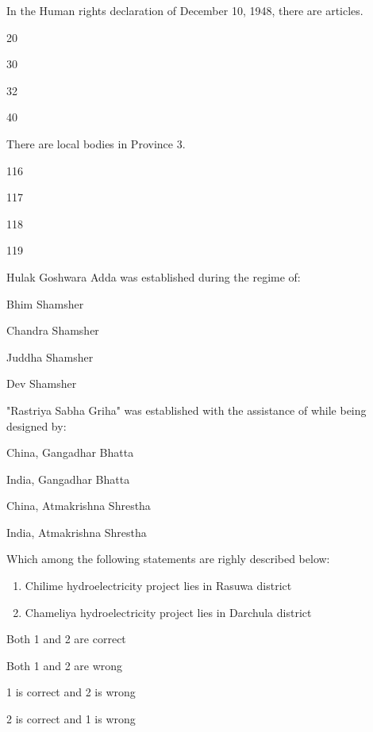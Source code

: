 \begin{questions}
\question In the Human rights declaration of December 10, 1948, there are \fillin[][2cm] articles.
  \begin{items}
  \item 20
  \item* 30
  \item 32
  \item 40
  \end{items}

\question There are \fillin[][2cm] local bodies in Province 3.
  \begin{items}
  \item 116
  \item 117
  \item 118
  \item* 119
  \end{items}

\question Hulak Goshwara Adda was established during the regime of:
  \begin{items}
  \item Bhim Shamsher
  \item* Chandra Shamsher
  \item Juddha Shamsher
  \item Dev Shamsher
  \end{items}

\question "Rastriya Sabha Griha" was established with the assistance of \fillin[][3.5cm] while being designed by:
  \begin{items}
  \item* China, Gangadhar Bhatta
  \item India, Gangadhar Bhatta
  \item China, Atmakrishna Shrestha
  \item India, Atmakrishna Shrestha
  \end{items}

\question Which among the following statements are righly described below:
  \begin{enumerate}
  \item Chilime hydroelectricity project lies in Rasuwa district
  \item Chameliya hydroelectricity project lies in Darchula district
  \end{enumerate}
  \begin{items}
  \item* Both 1 and 2 are correct
  \item Both 1 and 2 are wrong
  \item 1 is correct and 2 is wrong
  \item 2 is correct and 1 is wrong
  \end{items}


\end{questions}
